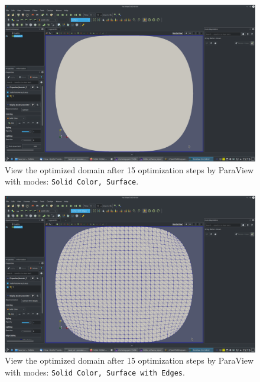 \documentclass[onsided]{book}
\numberwithin{equation}{section}
\begin{document}
\begin{enumerate}
\begin{enumerate}
        \begin{figure}[H]
            \centering
            \includegraphics[height=0.44\textheight]{level_set_optimized_domain_after_15_steps_Solid_Color_Surface}
            \caption{View the optimized domain after 15 optimization steps by ParaView with modes: \texttt{Solid Color, Surface}.}
        \end{figure}
        
        \begin{figure}[H]
            \centering
            \includegraphics[height=0.44\textheight]{level_set_optimized_domain_after_15_steps_Solid_Color_Surface_with_Edges}
            \caption{View the optimized domain after 15 optimization steps by ParaView with modes: \texttt{Solid Color, Surface with Edges}.}
        \end{figure}
        

\end{enumerate}
\end{enumerate}
\end{document}
